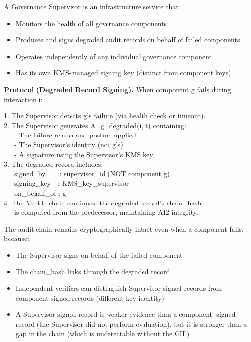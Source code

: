\begin{cdef}
A Governance Supervisor is an infrastructure service that:
\begin{itemize}
  \item Monitors the health of all governance components
  \item Produces and signs degraded audit records on behalf of failed components
  \item Operates independently of any individual governance component
  \item Has its own KMS-managed signing key (distinct from component keys)
\end{itemize}

\smallskip\noindent\textbf{Protocol (Degraded Record Signing).}
When component g fails during interaction i:

\begin{claddisp}
1. The Supervisor detects g's failure (via health check or timeout).\\
2. The Supervisor generates A\_g\_degraded(i, t) containing:\\
~~~- The failure reason and posture applied\\
~~~- The Supervisor's identity (not g's)\\
~~~- A signature using the Supervisor's KMS key\\
3. The degraded record includes:\\
~~~signed\_by~~~~: supervisor\_id (NOT component g)\\
~~~signing\_key~~: KMS\_key\_supervisor\\
~~~on\_behalf\_of : g\\
4. The Merkle chain continues: the degraded record's chain\_hash\\
~~~is computed from the predecessor, maintaining AI2 integrity.\\
\end{claddisp}
\end{cdef}

\begin{cprp}
The audit chain remains cryptographically intact even when a component fails, because:
\begin{itemize}
  \item The Supervisor signs on behalf of the failed component
  \item The chain\_\allowbreak{}hash links through the degraded record
  \item Independent verifiers can distinguish Supervisor-signed records from component-signed records (different key identity)
  \item A Supervisor-signed record is weaker evidence than a component- signed record (the Supervisor did not perform evaluation), but it is stronger than a gap in the chain (which is undetectable without the GIL)
\end{itemize}

\end{cprp}




